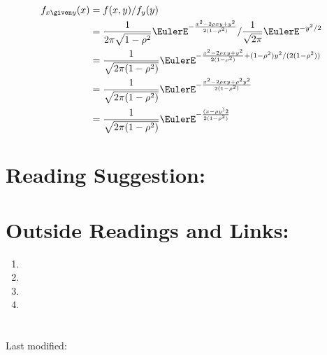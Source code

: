 \documentclass[12pt]{article}
\begin{document}
\begin{solution}
  \begin{align*}
    f_{x \given y}(x) &= f(x,y)/f_y(y) \\
    &= \frac{1}{2\pi \sqrt{1 - \rho^2}} \EulerE^{- \frac{x^2
        - 2 \rho x y + y^2}{2(1-\rho^2)}}/ 
    \frac{1}{\sqrt{2\pi}} \EulerE^{-y^2/2} \\
    &= \frac{1}{\sqrt{2\pi (1 - \rho^2)}}
    \EulerE^{- \frac{x^2
        - 2 \rho x y + y^2}{2(1-\rho^2)} + (1-\rho^2)
      y^2/(2(1-\rho^2))} \\
    &= \frac{1}{\sqrt{2\pi (1 - \rho^2)}}
    \EulerE^{- \frac{x^2
        - 2 \rho x y + \rho^2 y^2}{2(1-\rho^2)} } \\
    &= \frac{1}{\sqrt{2\pi (1 - \rho^2)}}
    \EulerE^{- \frac{(x - \rho y^)2}{2(1-\rho^2)} }
    \end{align*}
\end{solution}

\hr

\section*{Reading Suggestion:}




\hr

\section*{Outside Readings and Links:}
\begin{enumerate}
    \item
    \item
    \item
    \item
\end{enumerate}

\section*{\solutionsname}
\loadSolutions


\hr

\mydisclaim \myfooter

Last modified:  \flastmod
\end{document}
